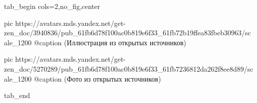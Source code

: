  
 
 
 
 


\ifcmt
  tab_begin cols=2,no_fig,center

     pic https://avatars.mds.yandex.net/get-zen_doc/3940836/pub_61fb6d78f100ac0b819e6f33_61fb72b19ffea83fbeb30963/scale_1200
		 @caption (Иллюстрация из открытых источников)

		 pic https://avatars.mds.yandex.net/get-zen_doc/5270289/pub_61fb6d78f100ac0b819e6f33_61fb7236812da262f8ee8d89/scale_1200
		 @caption (Фото из открытых источников)

  tab_end
\fi
